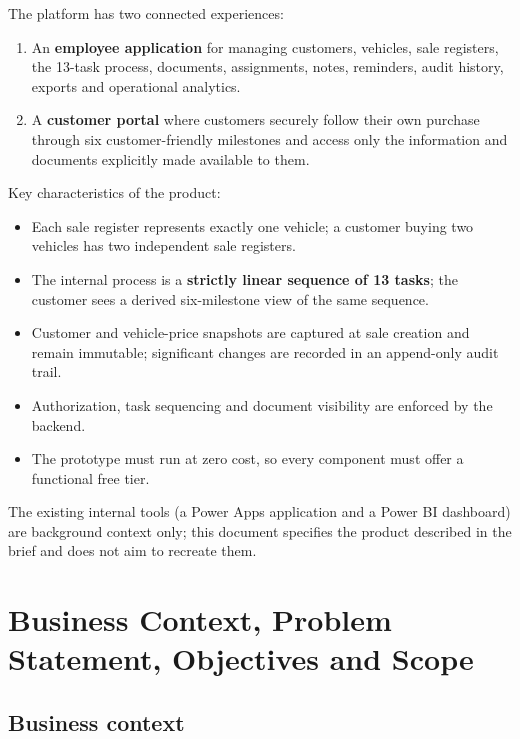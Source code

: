 \documentclass[11pt,a4paper]{article}
\begin{document}
The platform has two connected experiences:

\begin{enumerate}
	\item An \textbf{employee application} for managing customers, vehicles, sale registers, the 13-task process, documents, assignments, notes, reminders, audit history, exports and operational analytics.
	\item A \textbf{customer portal} where customers securely follow their own purchase through six customer-friendly milestones and access only the information and documents explicitly made available to them.
\end{enumerate}

Key characteristics of the product:

\begin{itemize}
	\item Each sale register represents exactly one vehicle; a customer buying two
	      vehicles has two independent sale registers.
	\item The internal process is a \textbf{strictly linear sequence of 13 tasks}; the customer sees a derived six-milestone view of the same sequence.
	\item Customer and vehicle-price snapshots are captured at sale creation and remain immutable; significant changes are recorded in an append-only audit trail.
	\item Authorization, task sequencing and document visibility are enforced by
	      the backend.
	\item The prototype must run at zero cost, so every component must offer a functional free tier.
\end{itemize}

The existing internal tools (a Power Apps application and a Power BI dashboard) are background context only; this document specifies the product described in the brief and does not aim to recreate them.

\section{Business Context, Problem Statement, Objectives and Scope}

\subsection{Business context}
\end{document}
